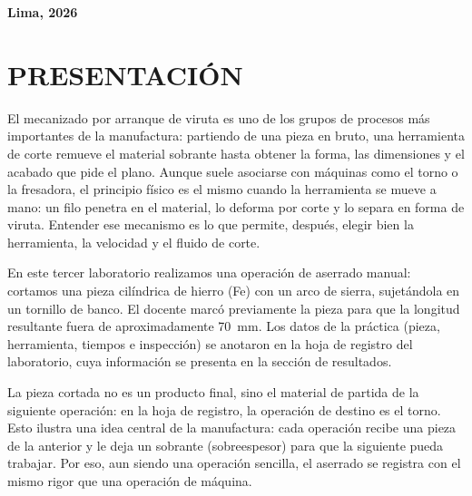 \documentclass[12pt,a4paper]{article}
\begin{document}
\begin{titlepage}
\begin{center}
		\vspace{1cm}

		\hspace{1.5cm}
	\end{center}

	\vfill
	\begin{center}
		{\sffamily\bfseries\color{darkblue}\large Lima, 2026\par}
	\end{center}
\end{titlepage}
\setcounter{page}{2}

\tableofcontents
\newpage

\section{PRESENTACIÓN}

El mecanizado por arranque de viruta es uno de los grupos de procesos más
importantes de la manufactura: partiendo de una pieza en bruto, una herramienta
de corte remueve el material sobrante hasta obtener la forma, las dimensiones y
el acabado que pide el plano. Aunque suele asociarse con máquinas como el torno
o la fresadora, el principio físico es el mismo cuando la herramienta se mueve a
mano: un filo penetra en el material, lo deforma por corte y lo separa en forma
de viruta. Entender ese mecanismo es lo que permite, después, elegir bien la
herramienta, la velocidad y el fluido de corte.

\vspace{6pt}

En este tercer laboratorio realizamos una operación de aserrado manual:
cortamos una pieza cilíndrica de hierro (Fe) con un arco de sierra,
sujetándola en un tornillo de banco. El docente marcó previamente la pieza para
que la longitud resultante fuera de aproximadamente \SI{70}{\milli\metre}. Los
datos de la práctica (pieza, herramienta, tiempos e inspección) se anotaron en
la hoja de registro del laboratorio, cuya información se presenta en la sección
de resultados.

\vspace{6pt}

La pieza cortada no es un producto final, sino el material de partida de
la siguiente operación: en la hoja de registro, la operación de destino es el
torno. Esto ilustra una idea central de la manufactura: cada operación
recibe una pieza de la anterior y le deja un sobrante (sobreespesor) para
que la siguiente pueda trabajar. Por eso, aun siendo una operación sencilla, el
aserrado se registra con el mismo rigor que una operación de máquina.
\end{document}

